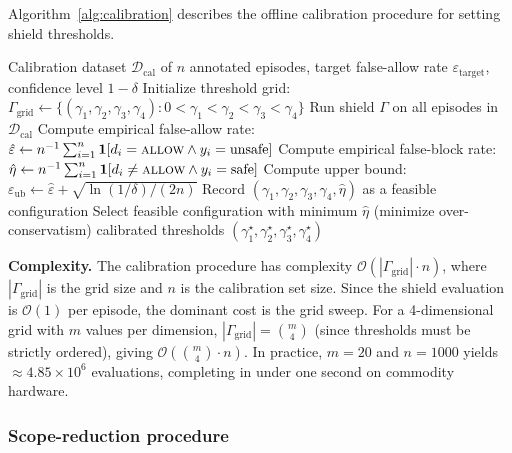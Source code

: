 \documentclass[10pt,journal,compsoc]{IEEEtran}
\begin{document}
Algorithm~\ref{alg:calibration} describes the offline calibration procedure for setting shield thresholds.

\begin{algorithm}[t]
\caption{Shield threshold calibration}
\label{alg:calibration}
\begin{algorithmic}[1]
\Require Calibration dataset $\mathcal{D}_{\mathrm{cal}}$ of $n$ annotated episodes, target false-allow rate $\varepsilon_{\mathrm{target}}$, confidence level $1-\delta$
\State Initialize threshold grid: $\Gamma_{\mathrm{grid}} \gets \{(\gamma_1,\gamma_2,\gamma_3,\gamma_4) : 0 < \gamma_1 < \gamma_2 < \gamma_3 < \gamma_4\}$
    \State Run shield $\Gamma$ on all episodes in $\mathcal{D}_{\mathrm{cal}}$
    \State Compute empirical false-allow rate: $\hat{\varepsilon} \gets n^{-1}\sum_{i=1}^{n} \mathbf{1}[d_i = \textsc{allow} \wedge y_i = \text{unsafe}]$
    \State Compute empirical false-block rate: $\hat{\eta} \gets n^{-1}\sum_{i=1}^{n} \mathbf{1}[d_i \neq \textsc{allow} \wedge y_i = \text{safe}]$
    \State Compute upper bound: $\varepsilon_{\mathrm{ub}} \gets \hat{\varepsilon} + \sqrt{\ln(1/\delta)/(2n)}$
        \State Record $(\gamma_1,\gamma_2,\gamma_3,\gamma_4, \hat{\eta})$ as a feasible configuration
    \EndIf
\EndFor
\State Select feasible configuration with minimum $\hat{\eta}$ (minimize over-conservatism)
\State \Return calibrated thresholds $(\gamma_1^\star, \gamma_2^\star, \gamma_3^\star, \gamma_4^\star)$
\end{algorithmic}
\end{algorithm}

\noindent\textbf{Complexity.}
The calibration procedure has complexity $\mathcal{O}(|\Gamma_{\mathrm{grid}}| \cdot n)$, where $|\Gamma_{\mathrm{grid}}|$ is the grid size and $n$ is the calibration set size.
Since the shield evaluation is $\mathcal{O}(1)$ per episode, the dominant cost is the grid sweep.
For a 4-dimensional grid with $m$ values per dimension, $|\Gamma_{\mathrm{grid}}| = \binom{m}{4}$ (since thresholds must be strictly ordered), giving $\mathcal{O}(\binom{m}{4} \cdot n)$.
In practice, $m = 20$ and $n = 1000$ yields $\approx 4.85 \times 10^6$ evaluations, completing in under one second on commodity hardware.

\subsubsection{Scope-reduction procedure}
\end{document}

